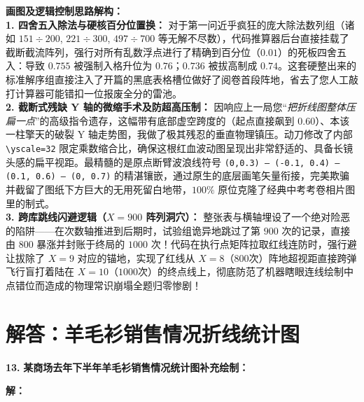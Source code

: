\vspace{0.4cm}
{\small\color{blue!70!black}
\textbf{画图及逻辑控制思路解构：}\\
\textbf{1. 四舍五入除法与硬核百分位置换：} 对于第一问近乎疯狂的庞大除法数列组（诸如 $151 \div 200$, $221 \div 300$, $497 \div 700$ 等无解不尽数），代码推算器后台直接挂载了截断截流阵列，强行对所有乱数浮点进行了精确到百分位（$0.01$）的死板四舍五入：导致 $0.755$ 被强制入格升位为 $0.76$；$0.736$ 被拔高制成 $0.74$。这套硬整出来的标准解序组直接注入了开篇的黑底表格槽位做好了阅卷首段阵地，省去了您人工敲打计算器可能错扣一位报废全分的雷池。\\
\textbf{2. 截断式残缺 Y 轴的微缩手术及防超高压制：} 因响应上一局您“\textit{把折线图整体压扁一点}”的高级指令遗存，这幅带有底部虚空跨度的（起点直接飙到 $0.60$）、本该一柱擎天的破裂 Y 轴走势图，我做了极其残忍的垂直物理镇压。动刀修改了内部 \texttt{\textbackslash{}yscale=32} 限定乘数缩合比，确保这根红血波动图呈现出非常舒适的、具备长镜头感的扁平视距。最精髓的是原点断臂波浪线符号 \texttt{(0,0.3) -- (-0.1, 0.4) -- (0.1, 0.6) -- (0, 0.7)} 的精湛镶嵌，通过原生的底层画笔矢量衔接，完美欺骗并截留了图纸下方巨大的无用死留白地带，$100\%$ 原位克隆了经典中考考卷相片图里的制式。\\
\textbf{3. 跨库跳线闪避逻辑（$X=900$ 阵列洞穴）：} 整张表与横轴埋设了一个绝对险恶的陷阱——在次数轴推进到后期时，试验组诡异地跳过了第 $900$ 次的记录，直接由 $800$ 暴涨并封账于终局的 $1000$ 次！代码在执行点矩阵拉取红线连防时，强行避让拔除了 $X=9$ 对应的锚地，实现了红线从 $X=8$（$800$次）阵地超视距直接跨弹飞行盲打着陆在 $X=10$（$1000$次）的终点线上，彻底防范了机器瞎眼连线绘制中点错位而造成的物理常识崩塌全题归零惨剧！
}

\newpage



\section{解答：羊毛衫销售情况折线统计图}

\vspace{0.6cm}

\textbf{\LARGE 13.} \textbf{某商场去年下半年羊毛衫销售情况统计图补充绘制：}

\vspace{0.6cm}
\textbf{解：}

